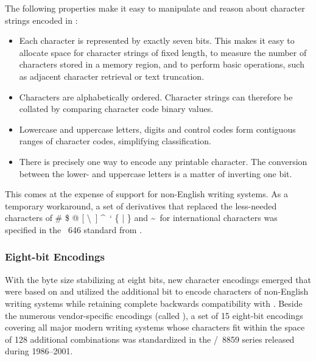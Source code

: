 \documentclass[a5paper,10pt]{book}
\begin{document}
The following properties make it easy to manipulate and reason about character
strings encoded in :
\begin{itemize}
  \item Each character is represented by exactly seven bits. This makes it easy
    to allocate space for character strings of fixed length, to measure the
    number of characters stored in a memory region, and to perform basic
    operations, such as adjacent character retrieval or text truncation.
  \item Characters are alphabetically ordered. Character strings can therefore
    be collated by comparing character code binary values.
  \item Lowercase and uppercase letters, digits and control codes form
    contiguous ranges of character codes, simplifying classification.
  \item There is precisely one way to encode any printable character. The
    conversion between the lower- and uppercase letters is a matter of
    inverting one bit.
\end{itemize}
This comes at the expense of support for non-English writing systems. As a
temporary workaround, a set of  derivatives that replaced the
less-needed characters of \# \$ @ [ \textbackslash\ ] \textasciicircum\ ` \{ |
\} and \textasciitilde\ for international characters was specified in the
~646 standard \cite{iso72} from \citeyear{iso72}.

\subsubsection{Eight-bit Encodings}
With the byte size stabilizing at eight bits, new character encodings emerged
that were based on  and utilized the additional bit to encode
characters of non-English writing systems while retaining complete backwards
compatibility with . Beside the numerous vendor-specific
encodings (called ), a set of 15 eight-bit encodings covering
all major modern writing systems whose characters fit within the space of 128
additional combinations was standardized in the
/~8859 series released during 1986--2001.

\end{document}
